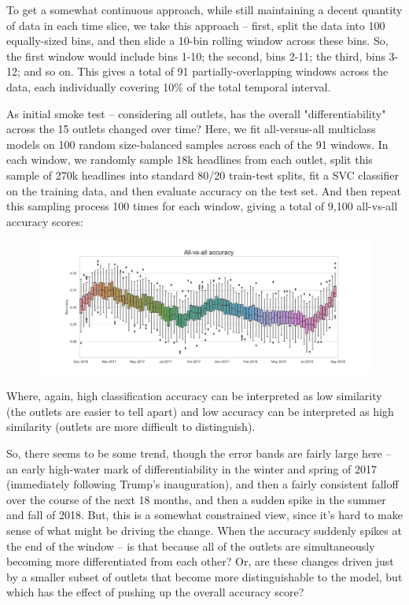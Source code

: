\documentclass{scrartcl}
\begin{document}
To get a somewhat continuous approach, while still maintaining a decent quantity of data in each time slice, we take this approach -- first, split the data into 100 equally-sized bins, and then slide a 10-bin rolling window across these bins. So, the first window would include bins 1-10; the second, bins 2-11; the third, bins 3-12; and so on. This gives a total of 91 partially-overlapping windows across the data, each individually covering 10\% of the total temporal interval.

As initial smoke test -- considering all outlets, has the overall "differentiability" across the 15 outlets changed over time? Here, we fit all-versus-all multiclass models on 100 random size-balanced samples across each of the 91 windows. In each window, we randomly sample 18k headlines from each outlet, split this sample of 270k headlines into standard 80/20 train-test splits, fit a SVC classifier on the training data, and then evaluate accuracy on the test set. And then repeat this sampling process 100 times for each window, giving a total of 9,100 all-vs-all accuracy scores:

\begin{figure}[H]
  \centering
  \includegraphics[width=\textwidth]{figures/ts-ava.png}
\end{figure}

Where, again, high classification accuracy can be interpreted as low similarity (the outlets are easier to tell apart) and low accuracy can be interpreted as high similarity (outlets are more difficult to distinguish).

So, there seems to be some trend, though the error bands are fairly large here -- an early high-water mark of differentiability in the winter and spring of 2017 (immediately following Trump's inauguration), and then a fairly consistent falloff over the course of the next 18 months, and then a sudden spike in the summer and fall of 2018. But, this is a somewhat constrained view, since it's hard to make sense of what might be driving the change. When the accuracy suddenly spikes at the end of the window -- is that because all of the outlets are simultaneously becoming more differentiated from each other? Or, are these changes driven just by a smaller subset of outlets that become more distinguishable to the model, but which has the effect of pushing up the overall accuracy score?
\end{document}
